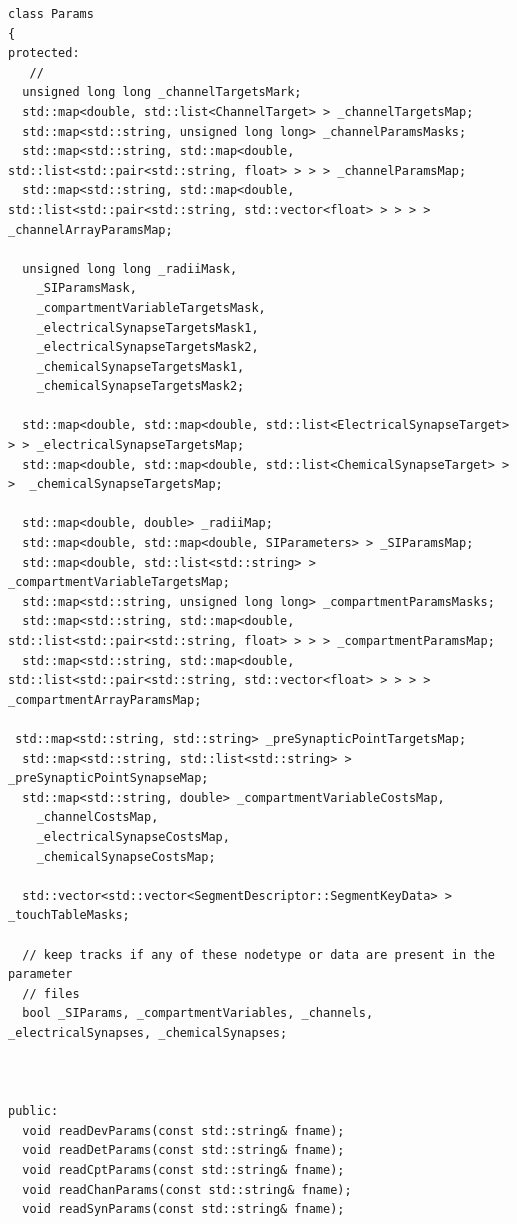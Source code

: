 \begin{lstlisting}[basicstyle=\tiny, %or \small or \footnotesize etc.
]
class Params
{
protected:
   //
  unsigned long long _channelTargetsMark;
  std::map<double, std::list<ChannelTarget> > _channelTargetsMap;
  std::map<std::string, unsigned long long> _channelParamsMasks;
  std::map<std::string, std::map<double, std::list<std::pair<std::string, float> > > > _channelParamsMap;
  std::map<std::string, std::map<double, std::list<std::pair<std::string, std::vector<float> > > > > _channelArrayParamsMap;

  unsigned long long _radiiMask, 
    _SIParamsMask, 
    _compartmentVariableTargetsMask,
    _electricalSynapseTargetsMask1, 
    _electricalSynapseTargetsMask2, 
    _chemicalSynapseTargetsMask1, 
    _chemicalSynapseTargetsMask2;
  
  std::map<double, std::map<double, std::list<ElectricalSynapseTarget> > > _electricalSynapseTargetsMap;
  std::map<double, std::map<double, std::list<ChemicalSynapseTarget> > >  _chemicalSynapseTargetsMap;

  std::map<double, double> _radiiMap;
  std::map<double, std::map<double, SIParameters> > _SIParamsMap;
  std::map<double, std::list<std::string> > _compartmentVariableTargetsMap; 
  std::map<std::string, unsigned long long> _compartmentParamsMasks;
  std::map<std::string, std::map<double, std::list<std::pair<std::string, float> > > > _compartmentParamsMap;
  std::map<std::string, std::map<double, std::list<std::pair<std::string, std::vector<float> > > > > _compartmentArrayParamsMap;

 std::map<std::string, std::string> _preSynapticPointTargetsMap;
  std::map<std::string, std::list<std::string> > _preSynapticPointSynapseMap;
  std::map<std::string, double> _compartmentVariableCostsMap,
    _channelCostsMap,
    _electricalSynapseCostsMap,
    _chemicalSynapseCostsMap;

  std::vector<std::vector<SegmentDescriptor::SegmentKeyData> > _touchTableMasks;

  // keep tracks if any of these nodetype or data are present in the parameter
  // files
  bool _SIParams, _compartmentVariables, _channels, _electricalSynapses, _chemicalSynapses;



public:
  void readDevParams(const std::string& fname);
  void readDetParams(const std::string& fname);
  void readCptParams(const std::string& fname);
  void readChanParams(const std::string& fname);
  void readSynParams(const std::string& fname);


\end{lstlisting}
